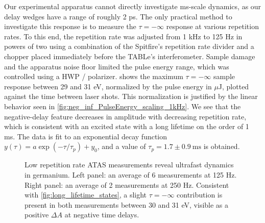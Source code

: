 Our experimental apparatus cannot directly investigate ms-scale dynamics, as our delay wedges have a range of roughly 2 ps. The only practical method to investigate this response is to measure the $\tau = -\infty$ response at various repetition rates. To this end, the repetition rate was adjusted from 1 kHz to 125 Hz in powers of two using a combination of the Spitfire's repetition rate divider and a chopper placed immediately before the TABLe's interferometer. Sample damage and the apparatus noise floor limited the pulse energy range, which was controlled using a HWP / polarizer.  shows the maximum ${\tau=-\infty}$ sample response between 29 and 31 eV, normalized by the pulse energy in $\mu$J, plotted against the time between laser shots. This normalization is justified by the linear behavior seen in \cref{fig:neg_inf_PulseEnergy_scaling_1kHz}. We see that the negative-delay feature decreases in amplitude with decreasing repetition rate, which is consistent with an excited state with a long lifetime on the order of 1 ms. The data is fit to an exponential decay function ${y(\tau) = a \exp(-\tau/\tau_p) + y_0}$, and a value of ${\tau_p = 1.7 \pm 0.9 \ \textrm{ms}}$ is obtained.

\begin{figure}
	\centering
	\qquad
	\caption{Low repetition rate ATAS measurements reveal ultrafast dynamics in germanium. Left panel: an average of 6 measurements at 125 Hz. Right panel: an average of 2 measurements at 250 Hz. Consistent with \cref{fig:long_lifetime_states}, a slight $\tau=-\infty$ contribution is present in both measurements between 30 and 31 eV, visible as a positive $\Delta A$ at negative time delays.}
	\label{fig:125vs250Hz_Ge_ATAS:delay}
\end{figure}


